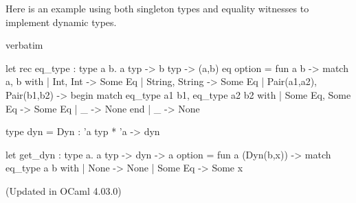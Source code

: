 Here is an example using both singleton types and equality witnesses
to implement dynamic types.
\begin{camlexample}{verbatim}
\begin{caml}
\begin{camlinput}
let rec eq_type : type a b. a typ -> b typ -> (a,b) eq option =
  fun a b ->
  match a, b with
  | Int, Int -> Some Eq
  | String, String -> Some Eq
  | Pair(a1,a2), Pair(b1,b2) ->
      begin match eq_type a1 b1, eq_type a2 b2 with
      | Some Eq, Some Eq -> Some Eq
      | _ -> None
      end
  | _ -> None

type dyn = Dyn : 'a typ * 'a -> dyn

let get_dyn : type a. a typ -> dyn -> a option =
  fun a (Dyn(b,x)) ->
  match eq_type a b with
  | None -> None
  | Some Eq -> Some x
\end{camlinput}
\end{caml}
\end{camlexample}

%
(Updated in OCaml 4.03.0)

